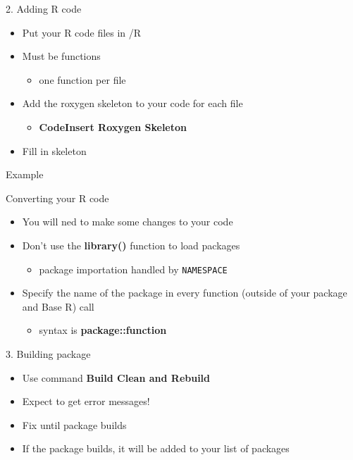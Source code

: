 \documentclass[
  ignorenonframetext,
  aspectratio=169]{beamer}
\providecommand{\tightlist}{%
  \setlength{\itemsep}{0pt}\setlength{\parskip}{0pt}}
\begin{document}
\begin{frame}{2. Adding R code}
\protect\hypertarget{adding-r-code}{}
\begin{itemize}
\tightlist
\item
  Put your R code files in /R
\item
  Must be functions

  \begin{itemize}
  \tightlist
  \item
    one function per file
  \end{itemize}
\item
  Add the roxygen skeleton to your code for each file

  \begin{itemize}
  \tightlist
  \item
    \textbf{Code\textbar Insert Roxygen Skeleton}
  \end{itemize}
\item
  Fill in skeleton
\end{itemize}
\end{frame}

\begin{frame}{Example}
\protect\hypertarget{example-3}{}
\end{frame}

\begin{frame}[fragile]{Converting your R code}
\protect\hypertarget{converting-your-r-code}{}
\begin{itemize}
\tightlist
\item
  You will ned to make some changes to your code
\item
  Don't use the \textbf{library()} function to load packages

  \begin{itemize}
  \tightlist
  \item
    package importation handled by \texttt{NAMESPACE}
  \end{itemize}
\item
  Specify the name of the package in every function (outside of your
  package and Base R) call

  \begin{itemize}
  \tightlist
  \item
    syntax is \textbf{package::function}
  \end{itemize}
\end{itemize}
\end{frame}

\begin{frame}{3. Building package}
\protect\hypertarget{building-package}{}
\begin{itemize}
\tightlist
\item
  Use command \textbf{Build \textbar{} Clean and Rebuild}
\item
  Expect to get error messages!
\item
  Fix until package builds
\item
  If the package builds, it will be added to your list of packages
\end{itemize}
\end{frame}
\end{document}
